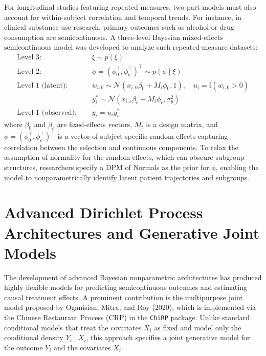\documentclass[11pt, a4paper]{article}
\begin{document}
For longitudinal studies featuring repeated measures, two-part models must also account for within-subject correlation and temporal trends.\cite{tooze2002} For instance, in clinical substance use research, primary outcomes such as alcohol or drug consumption are semicontinuous.\cite{neelon2011} A three-level Bayesian mixed-effects semicontinuous model was developed to analyze such repeated-measure datasets:
\begin{align}
\text{Level 3: } \quad & \xi \sim p(\xi) \\
\text{Level 2: } \quad & \phi = (\phi_0^\top, \phi_c^\top)^\top \sim p(\phi \mid \xi) \\
\text{Level 1 (latent): } \quad & w_{i,0} \sim \mathcal{N}(x_{i,0}\beta_0 + M_i\phi_0, 1), \quad u_i = \mathbb{I}(w_{i,0} > 0) \\
& y_i^* \sim \mathcal{N}(x_{i,c}\beta_c + M_i\phi_c, \sigma_y^2) \\
\text{Level 1 (observed): } \quad & y_i = u_i y_i^*
\end{align}
where $\beta_0$ and $\beta_c$ are fixed-effects vectors, $M_i$ is a design matrix, and $\phi = (\phi_0^\top, \phi_c^\top)^\top$ is a vector of subject-specific random effects capturing correlation between the selection and continuous components.\cite{neelon2011} To relax the assumption of normality for the random effects, which can obscure subgroup structures, researchers specify a DPM of Normals as the prior for $\phi$, enabling the model to nonparametrically identify latent patient trajectories and subgroups.\cite{neelon2010}


\section{Advanced Dirichlet Process Architectures and Generative Joint Models}

The development of advanced Bayesian nonparametric architectures has produced highly flexible models for predicting semicontinuous outcomes and estimating causal treatment effects.\cite{oganisian2021, oganisian2020} A prominent contribution is the multipurpose joint model proposed by Oganisian, Mitra, and Roy (2020), which is implemented via the Chinese Restaurant Process (CRP) in the \texttt{ChiRP} package.\cite{oganisian2020, oganisianpkg, neal2000} Unlike standard conditional models that treat the covariates $X_i$ as fixed and model only the conditional density $Y_i \mid X_i$, this approach specifies a joint generative model for the outcome $Y_i$ and the covariates $X_i$.\cite{oganisian2020}
\end{document}
